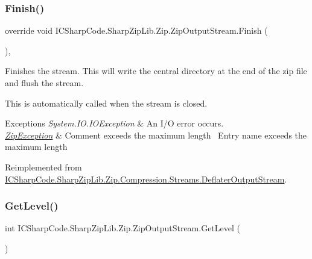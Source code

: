 \subsubsection{\texorpdfstring{Finish()}{Finish()}}
{\footnotesize\ttfamily override void I\+C\+Sharp\+Code.\+Sharp\+Zip\+Lib.\+Zip.\+Zip\+Output\+Stream.\+Finish (\begin{DoxyParamCaption}{ }\end{DoxyParamCaption})\hspace{0.3cm}{\ttfamily [inline]}, {\ttfamily [virtual]}}



Finishes the stream. This will write the central directory at the end of the zip file and flush the stream. 

This is automatically called when the stream is closed. 


\begin{DoxyExceptions}{Exceptions}
{\em System.\+I\+O.\+I\+O\+Exception} & An I/O error occurs. \\
\hline
{\em \hyperlink{class_i_c_sharp_code_1_1_sharp_zip_lib_1_1_zip_1_1_zip_exception}{Zip\+Exception}} & Comment exceeds the maximum length~\newline
 Entry name exceeds the maximum length \\
\hline
\end{DoxyExceptions}


Reimplemented from \hyperlink{class_i_c_sharp_code_1_1_sharp_zip_lib_1_1_zip_1_1_compression_1_1_streams_1_1_deflater_output_stream_ac81f3e741a1ffdf98c02a171ad7cb334}{I\+C\+Sharp\+Code.\+Sharp\+Zip\+Lib.\+Zip.\+Compression.\+Streams.\+Deflater\+Output\+Stream}.

\mbox{\label{class_i_c_sharp_code_1_1_sharp_zip_lib_1_1_zip_1_1_zip_output_stream_aac2f1bfe79b9ed9d53d2f7422b45593d}} 
\subsubsection{\texorpdfstring{Get\+Level()}{GetLevel()}}
{\footnotesize\ttfamily int I\+C\+Sharp\+Code.\+Sharp\+Zip\+Lib.\+Zip.\+Zip\+Output\+Stream.\+Get\+Level (\begin{DoxyParamCaption}{ }\end{DoxyParamCaption})\hspace{0.3cm}{\ttfamily [inline]}}



